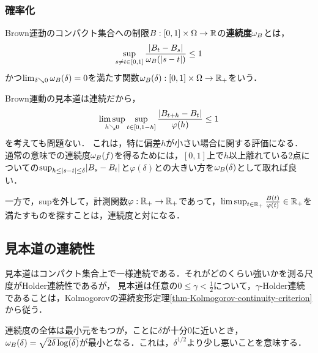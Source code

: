 \documentclass[uplatex,dvipdfmx]{jsreport}
\begin{document}
\subsubsection{確率化}

\begin{definition}
    Brown運動のコンパクト集合への制限$B:[0,1]\times\Omega\to\mathbb{R}$の\textbf{連続度}$\omega_B$とは，
    \[\sup_{s\ne t\in[0,1]}\frac{\lvert B_t-B_s\rvert}{\omega_B(\lvert s-t\rvert)}\le 1\]
    かつ$\lim_{\delta\searrow0}\omega_B(\delta)=0$を満たす関数$\omega_B(\delta):[0,1]\times\Omega\to\mathbb{R}_+$をいう．
\end{definition}
\begin{remark}
    Brown運動の見本道は連続だから，
    \[\limsup_{h\searrow 0}\sup_{t\in[0,1-h]}\frac{\lvert B_{t+h}-B_t\rvert}{\varphi(h)}\le 1\]
    を考えても問題ない．
    これは，特に偏差$h$が小さい場合に関する評価になる．
    通常の意味での連続度$\omega_B(f)$を得るためには，$[0,1]$上で$h$以上離れている2点についての$\sup_{h\le\lvert s-t\rvert\le\delta}\lvert B_s-B_t\rvert$と$\varphi(\delta)$との大きい方を$\omega_B(\delta)$として取れば良い．

    一方で，supを外して，計測関数$\varphi:\mathbb{R}_+\to\mathbb{R}_+$であって，$\limsup_{t\in\mathbb{R}_+}\frac{B(t)}{\varphi(t)}\in\mathbb{R}_+$を満たすものを探すことは，連続度と対になる．
\end{remark}

\subsection{見本道の連続性}

\begin{tcolorbox}[colframe=ForestGreen, colback=ForestGreen!10!white,breakable,colbacktitle=ForestGreen!40!white,coltitle=black,fonttitle=\bfseries\sffamily,
    title=]
    見本道はコンパクト集合上で一様連続である．それがどのくらい強いかを測る尺度がHolder連続性であるが，
    見本道は任意の$0\le\gamma<\frac{1}{2}$について，$\gamma$-Holder連続であることは，Kolmogorovの連続変形定理\ref{thm-Kolmogorov-continuity-criterion}から従う．

    連続度の全体は最小元をもつが，ことに$\delta$が十分$0$に近いとき，$\omega_B(\delta)=\sqrt{2\delta\log(\delta)}$が最小となる．これは，$\delta^{1/2}$より少し悪いことを意味する．
\end{tcolorbox}
\end{document}
